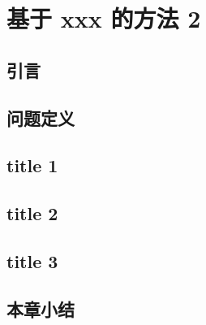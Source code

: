 \chapter{基于 xxx 的方法 2}
\label{ch4}
\section{引言}
\section{问题定义}
\section{title 1}
\section{title 2}
\section{title 3}
\section{本章小结}